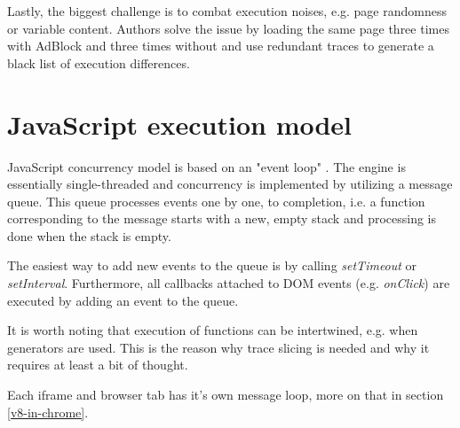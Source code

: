 Lastly, the biggest challenge is to combat execution noises, e.g. page randomness or variable content.
Authors solve the issue by loading the same page three times with AdBlock and three times without and
use redundant traces to generate a black list of execution differences.


\section{JavaScript execution model}
\label{js-exec-model}

JavaScript concurrency model is based on an "event loop" \cite{mozilla:event-loop}. The engine is essentially single-threaded
and concurrency is implemented by utilizing a message queue. This queue processes events one by one, to completion, i.e.
a function corresponding to the message starts with a new, empty stack and processing is done when the stack is empty.

The easiest way to add new events to the queue is by calling \emph{setTimeout} or \emph{setInterval}.
Furthermore, all callbacks attached to DOM events (e.g. \emph{onClick}) are executed by adding an event to the queue.

It is worth noting that execution of functions can be intertwined, e.g. when generators are used.
This is the reason why trace slicing is needed and why it requires at least a bit of thought.

Each iframe and browser tab has it's own message loop, more on that in section \ref{v8-in-chrome}.